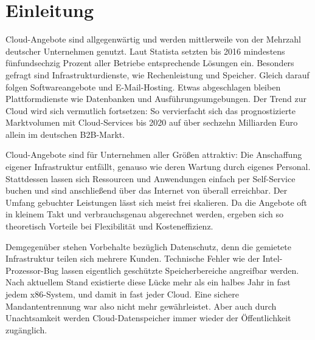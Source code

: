 \chapter{Einleitung}


Cloud-Angebote sind allgegenwärtig und werden mittlerweile von der Mehrzahl deutscher Unternehmen genutzt. Laut Statista setzten bis 2016 mindestens fünfundsechzig Prozent aller Betriebe entsprechende Lösungen ein. 
Besonders gefragt sind Infrastrukturdienste, wie Rechenleistung und Speicher. Gleich darauf folgen Softwareangebote und E-Mail-Hosting. Etwas abgeschlagen bleiben Plattformdienste wie Datenbanken und Ausführungsumgebungen. %
Der Trend zur Cloud wird sich vermutlich fortsetzen: So vervierfacht sich das prognostizierte Marktvolumen mit Cloud-Services bis 2020 auf über sechzehn Milliarden Euro allein im deutschen B2B-Markt. %

Cloud-Angebote sind für Unternehmen aller Größen attraktiv: Die Anschaffung eigener Infrastruktur entfällt, genauso wie deren Wartung durch eigenes Personal. Stattdessen lassen sich Ressourcen und Anwendungen einfach per Self-Service buchen und sind anschließend über das Internet von überall erreichbar. Der Umfang gebuchter Leistungen lässt sich meist frei skalieren. Da die Angebote oft in kleinem Takt und verbrauchsgenau abgerechnet werden, ergeben sich so theoretisch Vorteile bei Flexibilität und Kosteneffizienz.

Demgegenüber stehen Vorbehalte bezüglich Datenschutz, denn die gemietete Infrastruktur teilen sich mehrere Kunden. Technische Fehler wie der 
Intel-Prozessor-Bug lassen eigentlich geschützte Speicherbereiche angreifbar werden. Nach aktuellem Stand existierte diese Lücke mehr als ein halbes Jahr in fast jedem x86-System, und damit in fast jeder Cloud. Eine sichere Mandantentrennung war also nicht mehr gewährleistet. Aber auch durch Unachtsamkeit werden Cloud-Datenspeicher immer wieder der Öffentlichkeit zugänglich.

